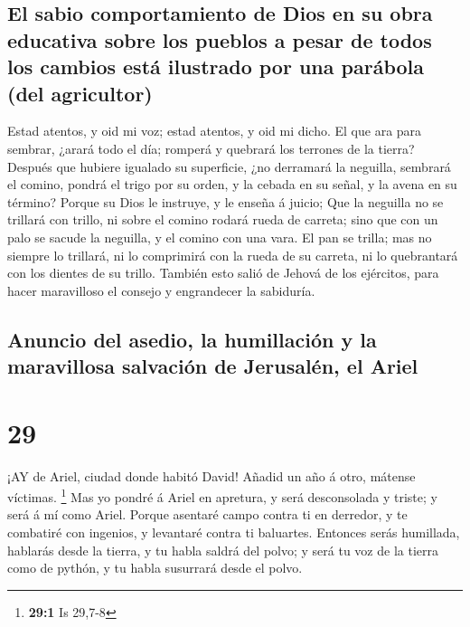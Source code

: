 \hypertarget{el-sabio-comportamiento-de-dios-en-su-obra-educativa-sobre-los-pueblos-a-pesar-de-todos-los-cambios-estuxe1-ilustrado-por-una-paruxe1bola-del-agricultor}{%
\subsection{El sabio comportamiento de Dios en su obra educativa sobre
los pueblos a pesar de todos los cambios está ilustrado por una parábola
(del
agricultor)}\label{el-sabio-comportamiento-de-dios-en-su-obra-educativa-sobre-los-pueblos-a-pesar-de-todos-los-cambios-estuxe1-ilustrado-por-una-paruxe1bola-del-agricultor}}

 Estad atentos, y oid mi voz; estad atentos, y oid mi
dicho.  El que ara para sembrar, ¿arará todo el día;
romperá y quebrará los terrones de la tierra?  Después que
hubiere igualado su superficie, ¿no derramará la neguilla, sembrará el
comino, pondrá el trigo por su orden, y la cebada en su señal, y la
avena en su término?  Porque su Dios le instruye, y le
enseña á juicio;  Que la neguilla no se trillará con
trillo, ni sobre el comino rodará rueda de carreta; sino que con un palo
se sacude la neguilla, y el comino con una vara.  El pan se
trilla; mas no siempre lo trillará, ni lo comprimirá con la rueda de su
carreta, ni lo quebrantará con los dientes de su trillo. 
También esto salió de Jehová de los ejércitos, para hacer maravilloso el
consejo y engrandecer la sabiduría.

\hypertarget{anuncio-del-asedio-la-humillaciuxf3n-y-la-maravillosa-salvaciuxf3n-de-jerusaluxe9n-el-ariel}{%
\subsection{Anuncio del asedio, la humillación y la maravillosa
salvación de Jerusalén, el
Ariel}\label{anuncio-del-asedio-la-humillaciuxf3n-y-la-maravillosa-salvaciuxf3n-de-jerusaluxe9n-el-ariel}}

\hypertarget{section-28}{%
\section{29}\label{section-28}}

 ¡AY de Ariel, ciudad donde habitó David! Añadid un año á
otro, mátense víctimas. \footnote{\textbf{29:1} Is 29,7-8} 
Mas yo pondré á Ariel en apretura, y será desconsolada y triste; y será
á mí como Ariel.  Porque asentaré campo contra ti en
derredor, y te combatiré con ingenios, y levantaré contra ti baluartes.
 Entonces serás humillada, hablarás desde la tierra, y tu
habla saldrá del polvo; y será tu voz de la tierra como de pythón, y tu
habla susurrará desde el polvo.

